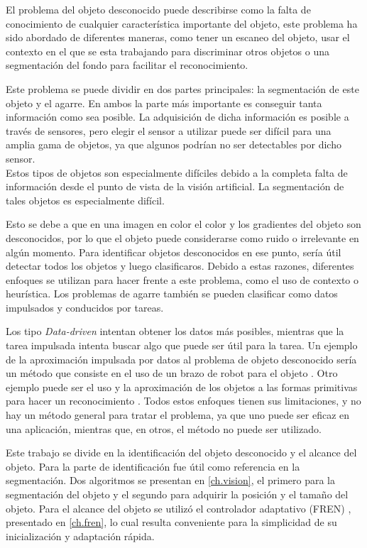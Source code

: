 El problema del objeto desconocido puede describirse como la falta de conocimiento de cualquier característica importante del objeto, este problema ha sido abordado de diferentes maneras, como tener un escaneo del objeto, usar el contexto en el que se esta trabajando para discriminar otros objetos o una segmentación del fondo para facilitar el reconocimiento.

Este problema se puede dividir en dos partes principales: la segmentación de este objeto y el agarre. En ambos la parte más importante es conseguir tanta información como sea posible. La adquisición de dicha información es posible a través de sensores, pero elegir el sensor a utilizar puede ser difícil para una amplia gama de objetos, ya que algunos podrían no ser detectables por dicho sensor. \\

Estos tipos de objetos son especialmente difíciles debido a la completa falta de información desde el punto de vista de la visión artificial. La segmentación de tales objetos es especialmente difícil.

Esto se debe a que en una imagen en color el color y los gradientes del objeto son desconocidos, por lo que el objeto puede considerarse como ruido o irrelevante en algún momento. Para identificar objetos desconocidos en ese punto, sería útil detectar todos los objetos y luego clasificaros. Debido a estas razones, diferentes enfoques se utilizan para hacer frente a este problema, como el uso de contexto o heurística. Los problemas de agarre también se pueden clasificar como datos impulsados y conducidos por tareas.


Los tipo \textit{Data-driven} intentan obtener los datos más posibles, mientras que la tarea impulsada intenta buscar algo que puede ser útil para la tarea. Un ejemplo de la aproximación impulsada por datos al problema de objeto desconocido sería un método que consiste en el uso de un brazo de robot para el objeto \cite{kaneko1994contact}. Otro ejemplo puede ser el uso y la aproximación de los objetos a las formas primitivas para hacer un reconocimiento \cite{fornas2016fitting, felip2009robust, miller2003automatic, huebner2008selection}. Todos estos enfoques tienen sus limitaciones, y no hay un método general para tratar el problema, ya que uno puede ser eficaz en una aplicación, mientras que, en otros, el método no puede ser utilizado.

Este trabajo se divide en la identificación del objeto desconocido y el alcance del objeto. Para la parte de identificación \cite{hosang2016makes} fue útil como referencia en la segmentación. Dos algoritmos se presentan en \cref{ch.vision}, el primero para la segmentación del objeto y el segundo para adquirir la posición y el tamaño del objeto.
Para el alcance del objeto se utilizó el controlador adaptativo (FREN) \cite{fren}, presentado en \cref{ch.fren}, lo cual resulta conveniente para la simplicidad de su inicialización y adaptación rápida.





